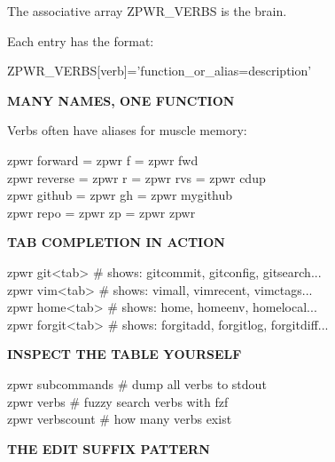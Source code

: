 \documentclass[11pt,a4paper,twoside]{book}
\begin{document}
The associative array ZPWR\_VERBS is the brain.

Each entry has the format:

ZPWR\_VERBS[verb]='function\_or\_alias=description'


\vspace{12pt}
{\bfseries\color{neonyellow} MANY NAMES, ONE FUNCTION}\vspace{4pt}

Verbs often have aliases for muscle memory:

\begin{codebox}
zpwr forward  = zpwr f   = zpwr fwd\\
zpwr reverse  = zpwr r   = zpwr rvs = zpwr cdup\\
zpwr github   = zpwr gh  = zpwr mygithub\\
zpwr repo     = zpwr zp  = zpwr zpwr\\
\end{codebox}


\vspace{12pt}
{\bfseries\color{neonyellow} TAB COMPLETION IN ACTION}\vspace{4pt}

\begin{codebox}
zpwr git<tab>     \# shows: gitcommit, gitconfig, gitsearch...\\
zpwr vim<tab>     \# shows: vimall, vimrecent, vimctags...\\
zpwr home<tab>    \# shows: home, homeenv, homelocal...\\
zpwr forgit<tab>  \# shows: forgitadd, forgitlog, forgitdiff...\\
\end{codebox}


\vspace{12pt}
{\bfseries\color{neonyellow} INSPECT THE TABLE YOURSELF}\vspace{4pt}

\begin{codebox}
zpwr subcommands        \# dump all verbs to stdout\\
zpwr verbs     \# fuzzy search verbs with fzf\\
zpwr verbscount          \# how many verbs exist\\
\end{codebox}


\vspace{12pt}
{\bfseries\color{neonyellow} THE EDIT SUFFIX PATTERN}\vspace{4pt}
\end{document}
